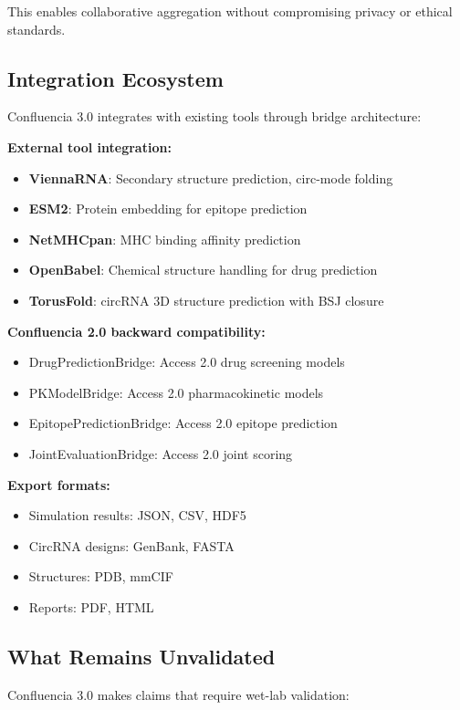 \documentclass[12pt]{article}
\begin{document}
This enables collaborative aggregation without compromising privacy or ethical standards.

\subsection{Integration Ecosystem}

Confluencia 3.0 integrates with existing tools through bridge architecture:

\textbf{External tool integration:}
\begin{itemize}
\item \textbf{ViennaRNA}: Secondary structure prediction, circ-mode folding
\item \textbf{ESM2}: Protein embedding for epitope prediction
\item \textbf{NetMHCpan}: MHC binding affinity prediction
\item \textbf{OpenBabel}: Chemical structure handling for drug prediction
\item \textbf{TorusFold}: circRNA 3D structure prediction with BSJ closure
\end{itemize}

\textbf{Confluencia 2.0 backward compatibility:}
\begin{itemize}
\item DrugPredictionBridge: Access 2.0 drug screening models
\item PKModelBridge: Access 2.0 pharmacokinetic models
\item EpitopePredictionBridge: Access 2.0 epitope prediction
\item JointEvaluationBridge: Access 2.0 joint scoring
\end{itemize}

\textbf{Export formats:}
\begin{itemize}
\item Simulation results: JSON, CSV, HDF5
\item CircRNA designs: GenBank, FASTA
\item Structures: PDB, mmCIF
\item Reports: PDF, HTML
\end{itemize}

\subsection{What Remains Unvalidated}

Confluencia 3.0 makes claims that require wet-lab validation:
\end{document}
